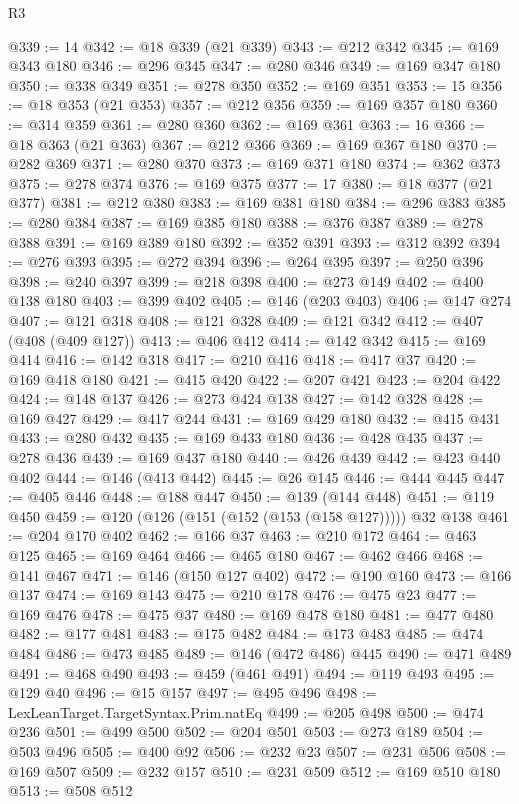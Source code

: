 \begin{lexlean}{R3}
\begin{coremodule}
@339 := 14
@342 := @18 @339 (@21 @339)
@343 := @212 @342
@345 := @169 @343 @180
@346 := @296 @345
@347 := @280 @346
@349 := @169 @347 @180
@350 := @338 @349
@351 := @278 @350
@352 := @169 @351
@353 := 15
@356 := @18 @353 (@21 @353)
@357 := @212 @356
@359 := @169 @357 @180
@360 := @314 @359
@361 := @280 @360
@362 := @169 @361
@363 := 16
@366 := @18 @363 (@21 @363)
@367 := @212 @366
@369 := @169 @367 @180
@370 := @282 @369
@371 := @280 @370
@373 := @169 @371 @180
@374 := @362 @373
@375 := @278 @374
@376 := @169 @375
@377 := 17
@380 := @18 @377 (@21 @377)
@381 := @212 @380
@383 := @169 @381 @180
@384 := @296 @383
@385 := @280 @384
@387 := @169 @385 @180
@388 := @376 @387
@389 := @278 @388
@391 := @169 @389 @180
@392 := @352 @391
@393 := @312 @392
@394 := @276 @393
@395 := @272 @394
@396 := @264 @395
@397 := @250 @396
@398 := @240 @397
@399 := @218 @398
@400 := @273 @149
@402 := @400 @138 @180
@403 := @399 @402
@405 := @146 (@203 @403)
@406 := @147 @274
@407 := @121 @318
@408 := @121 @328
@409 := @121 @342
@412 := @407 (@408 (@409 @127))
@413 := @406 @412
@414 := @142 @342
@415 := @169 @414
@416 := @142 @318
@417 := @210 @416
@418 := @417 @37
@420 := @169 @418 @180
@421 := @415 @420
@422 := @207 @421
@423 := @204 @422
@424 := @148 @137
@426 := @273 @424 @138
@427 := @142 @328
@428 := @169 @427
@429 := @417 @244
@431 := @169 @429 @180
@432 := @415 @431
@433 := @280 @432
@435 := @169 @433 @180
@436 := @428 @435
@437 := @278 @436
@439 := @169 @437 @180
@440 := @426 @439
@442 := @423 @440 @402
@444 := @146 (@413 @442)
@445 := @26 @145
@446 := @444 @445
@447 := @405 @446
@448 := @188 @447
@450 := @139 (@144 @448)
@451 := @119 @450
@459 := @120 (@126 (@151 (@152 (@153 (@158 @127))))) @32 @138
@461 := @204 @170 @402
@462 := @166 @37
@463 := @210 @172
@464 := @463 @125
@465 := @169 @464
@466 := @465 @180
@467 := @462 @466
@468 := @141 @467
@471 := @146 (@150 @127 @402)
@472 := @190 @160
@473 := @166 @137
@474 := @169 @143
@475 := @210 @178
@476 := @475 @23
@477 := @169 @476
@478 := @475 @37
@480 := @169 @478 @180
@481 := @477 @480
@482 := @177 @481
@483 := @175 @482
@484 := @173 @483
@485 := @474 @484
@486 := @473 @485
@489 := @146 (@472 @486) @445
@490 := @471 @489
@491 := @468 @490
@493 := @459 (@461 @491)
@494 := @119 @493
@495 := @129 @40
@496 := @15 @157
@497 := @495 @496
@498 := LexLeanTarget.TargetSyntax.Prim.natEq
@499 := @205 @498
@500 := @474 @236
@501 := @499 @500
@502 := @204 @501
@503 := @273 @189
@504 := @503 @496
@505 := @400 @92
@506 := @232 @23
@507 := @231 @506
@508 := @169 @507
@509 := @232 @157
@510 := @231 @509
@512 := @169 @510 @180
@513 := @508 @512

\end{coremodule}
\end{lexlean}
